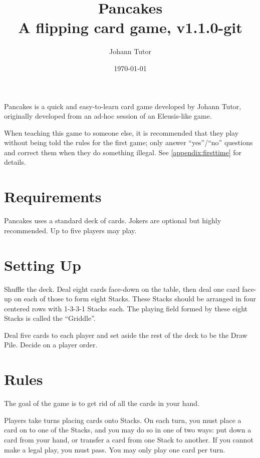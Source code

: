 \documentclass{article}
\newcommand\theversion{1.1.0-git}
\begin{document}
\title{Pancakes\\ \large A flipping card game, v\theversion}
\author{Johann Tutor}
\date{\today}
\maketitle

Pancakes is a quick and easy-to-learn card game developed by Johann Tutor, originally developed from an ad-hoc session of an Eleusis-like game.

When teaching this game to someone else, it is recommended that they play without being told the rules for the first game;
only answer ``yes''/``no'' questions and correct them when they do something illegal. See \autoref{appendix:firsttime} for details.

\tableofcontents

\newpage

\section{Requirements}
\label{sec:requirements}

Pancakes uses a standard deck of cards. Jokers are optional but highly recommended.
Up to five players may play.

\section{Setting Up}
\label{sec:setup}

Shuffle the deck. Deal eight cards face-down on the table, then deal one card face-up on each of those to form eight Stacks.
These Stacks should be arranged in four centered rows with 1-3-3-1 Stacks each.
The playing field formed by these eight Stacks is called the ``Griddle''.

Deal five cards to each player and set aside the rest of the deck to be the Draw Pile. Decide on a player order.

\section{Rules}
\label{sec:rules}

The goal of the game is to get rid of all the cards in your hand.

Players take turns placing cards onto Stacks. On each turn, you must place a card on to one of the Stacks, and you may do so in one of two ways: put down a card from your hand, or transfer a card from one Stack to another. If you cannot make a legal play, you must pass. You may only play one card per turn.
\end{document}
